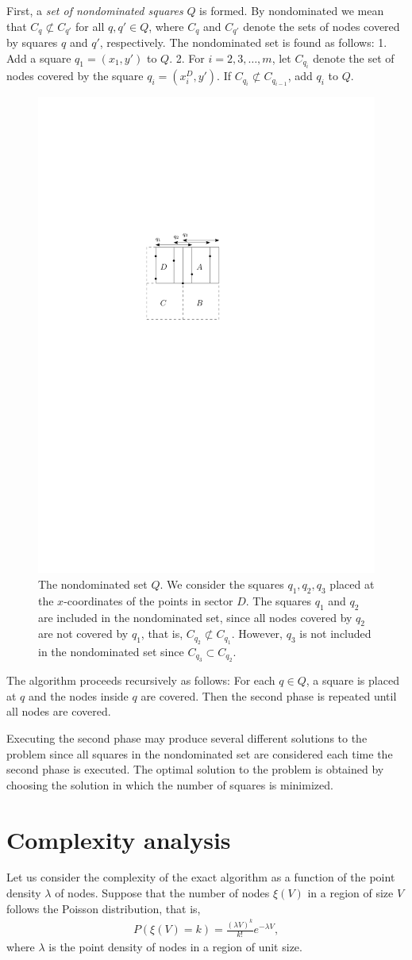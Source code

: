 \documentclass{article}
\begin{document}
First, a \emph{set of nondominated squares} $Q$ is formed. By nondominated we mean 
that $C_q \not \subset C_{q'}$ for all $q,q' \in Q$, where $C_q$ and $C_{q'}$ denote
the sets of nodes covered by squares $q$ and $q'$, respectively. The nondominated 
set is found as follows: 1. Add a square $q_1 = (x_1,y')$ to $Q$. 2. For $i = 2,3,\ldots,m$,
let $C_{q_i}$ denote the set of nodes covered by the square $q_i = (x_i^D,y')$. If $C_{q_i} \not \subset C_{q_{i-1}}$,
add $q_{i}$ to $Q$.

\begin{figure}[ht]
\begin{center}
\includegraphics[width=0.4\columnwidth]{nondominated01}
\caption{The nondominated set $Q$. We consider the squares $q_1,q_2,q_3$ placed at
the $x$-coordinates of the points in sector $D$. The squares $q_1$ and $q_2$ are included in 
the nondominated set, since all nodes covered by $q_2$ are not covered by $q_1$, that is, $C_{q_2} \not \subset C_{q_1}$.
However, $q_3$ is not included in the nondominated set since $C_{q_3} \subset C_{q_2}$.
}
\label{nondominated01}
\end{center}
\end{figure}

The algorithm proceeds recursively as follows: For each $q \in Q$, a square is placed at $q$
and the nodes inside $q$ are covered. Then the second phase is repeated until all nodes are covered.

Executing the second phase may produce several different solutions to the problem since all
squares in the nondominated set are considered each time the second phase is executed.
The optimal solution to the problem is obtained by choosing the solution in which the 
number of squares is minimized.

\section{Complexity analysis}
Let us consider the complexity of the exact algorithm as a function of the point
density $\lambda$ of nodes. 
Suppose that the number of nodes $\xi(V)$ in a region of size $V$ follows the Poisson 
distribution, that is, 
\begin{align*}
P(\xi(V)=k) = \frac{(\lambda V)^k}{k!} e^{-\lambda V},
\end{align*}
where $\lambda$ is the point density of nodes in a region of unit size.
\end{document}
